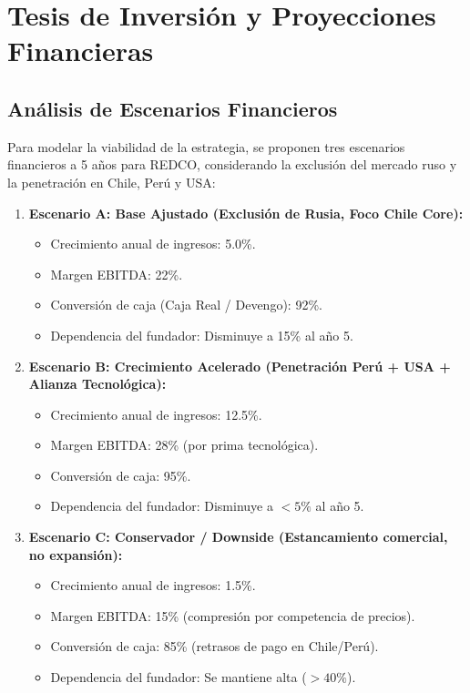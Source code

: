\chapter{Tesis de Inversión y Proyecciones Financieras}

\section{Análisis de Escenarios Financieros}

Para modelar la viabilidad de la estrategia, se proponen tres escenarios financieros a 5 años para REDCO, considerando la exclusión del mercado ruso y la penetración en Chile, Perú y USA:

\begin{enumerate}
    \item \textbf{Escenario A: Base Ajustado (Exclusión de Rusia, Foco Chile Core):}
    \begin{itemize}
        \item Crecimiento anual de ingresos: 5.0\%.
        \item Margen EBITDA: 22\%.
        \item Conversión de caja (Caja Real / Devengo): 92\%.
        \item Dependencia del fundador: Disminuye a 15\% al año 5.
    \end{itemize}

    \item \textbf{Escenario B: Crecimiento Acelerado (Penetración Perú + USA + Alianza Tecnológica):}
    \begin{itemize}
        \item Crecimiento anual de ingresos: 12.5\%.
        \item Margen EBITDA: 28\% (por prima tecnológica).
        \item Conversión de caja: 95\%.
        \item Dependencia del fundador: Disminuye a $<5\%$ al año 5.
    \end{itemize}

    \item \textbf{Escenario C: Conservador / Downside (Estancamiento comercial, no expansión):}
    \begin{itemize}
        \item Crecimiento anual de ingresos: 1.5\%.
        \item Margen EBITDA: 15\% (compresión por competencia de precios).
        \item Conversión de caja: 85\% (retrasos de pago en Chile/Perú).
        \item Dependencia del fundador: Se mantiene alta ($>40\%$).
    \end{itemize}
\end{enumerate}


